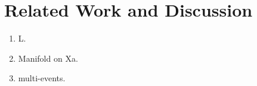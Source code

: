 \section{Related Work and Discussion}

\label{sec:MAMT:discussion}

\begin{enumerate}[(1)]
\item L.
\item Manifold on Xa. 
\item multi-events.
\end{enumerate}
